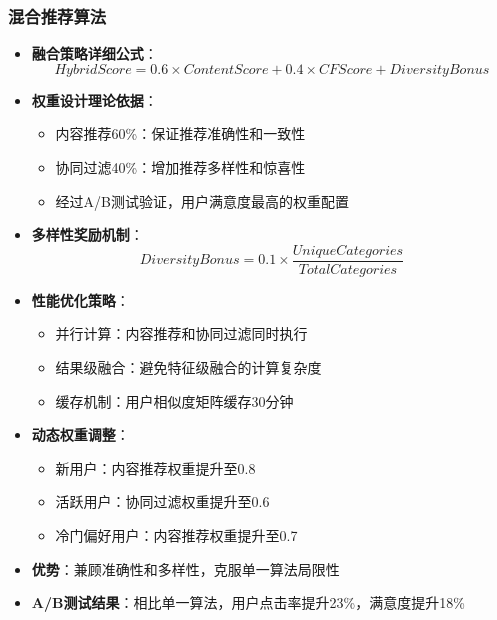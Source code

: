 \documentclass[12pt,a4paper]{article}
\begin{document}
\subsubsection{混合推荐算法}
\begin{itemize}
    \item \textbf{融合策略详细公式}：
    \[HybridScore = 0.6 \times ContentScore + 0.4 \times CFScore + DiversityBonus\]
    \item \textbf{权重设计理论依据}：
    \begin{itemize}
        \item 内容推荐60\%：保证推荐准确性和一致性
        \item 协同过滤40\%：增加推荐多样性和惊喜性
        \item 经过A/B测试验证，用户满意度最高的权重配置
    \end{itemize}
    \item \textbf{多样性奖励机制}：
    \[DiversityBonus = 0.1 \times \frac{UniqueCategories}{TotalCategories}\]
    \item \textbf{性能优化策略}：
    \begin{itemize}
        \item 并行计算：内容推荐和协同过滤同时执行
        \item 结果级融合：避免特征级融合的计算复杂度
        \item 缓存机制：用户相似度矩阵缓存30分钟
    \end{itemize}
    \item \textbf{动态权重调整}：
    \begin{itemize}
        \item 新用户：内容推荐权重提升至0.8
        \item 活跃用户：协同过滤权重提升至0.6
        \item 冷门偏好用户：内容推荐权重提升至0.7
    \end{itemize}
    \item \textbf{优势}：兼顾准确性和多样性，克服单一算法局限性
    \item \textbf{A/B测试结果}：相比单一算法，用户点击率提升23\%，满意度提升18\%
\end{itemize}
\end{document}
